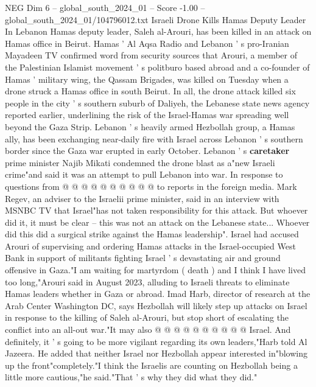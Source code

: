 \begin{textsample}{NEG Dim 6 – global\_south\_2024\_01 – Score -1.00 – global\_south\_2024\_01/104796012.txt}  \label{ex:f6_neg_346}
Israeli Drone Kills Hamas Deputy Leader In Lebanon Hamas deputy leader, Saleh al-Arouri, has been killed in an attack on Hamas office in Beirut.
Hamas ' Al Aqsa Radio and Lebanon ' s pro-Iranian Mayadeen TV confirmed word from security sources that Arouri, a member of the Palestinian Islamist movement ' s politburo based abroad and a co-founder of Hamas ' military wing, the Qassam Brigades, was killed on Tuesday when a drone struck a Hamas office in south Beirut.
In all, the drone attack killed six people in the city ' s southern suburb of Daliyeh, the Lebanese state news agency reported earlier, underlining the risk of the Israel-Hamas war spreading well beyond the Gaza Strip.
Lebanon ' s heavily armed Hezbollah group, a Hamas ally, has been exchanging near-daily fire with Israel across Lebanon ' s southern border since the Gaza war erupted in early October.
Lebanon ' s \textbf{caretaker} prime minister Najib Mikati condemned the drone blast as a"new Israeli crime"and said it was an attempt to pull Lebanon into war.
In response to questions from @ @ @ @ @ @ @ @ @ @ to reports in the foreign media.
Mark Regev, an adviser to the Israelii prime minister, said in an interview with MSNBC TV that Israel"has not taken responsibility for this attack.
But whoever did it, it must be clear -- this was not an attack on the Lebanese state...
Whoever did this did a surgical strike against the Hamas leadership".
Israel had accused Arouri of supervising and ordering Hamas attacks in the Israel-occupied West Bank in support of militants fighting Israel ' s devastating air and ground offensive in Gaza."I am waiting for martyrdom ( death ) and I think I have lived too long,"Arouri said in August 2023, alluding to Israeli threats to eliminate Hamas leaders whether in Gaza or abroad.
Imad Harb, director of research at the Arab Center Washington DC, says Hezbollah will likely step up attacks on Israel in response to the killing of Saleh al-Arouri, but stop short of escalating the conflict into an all-out war."It may also @ @ @ @ @ @ @ @ @ @ Israel.
And definitely, it ' s going to be more vigilant regarding its own leaders,"Harb told Al Jazeera.
He added that neither Israel nor Hezbollah appear interested in"blowing up the front"completely."I think the Israelis are counting on Hezbollah being a little more cautious,"he said."That ' s why they did what they did."

\end{textsample}
